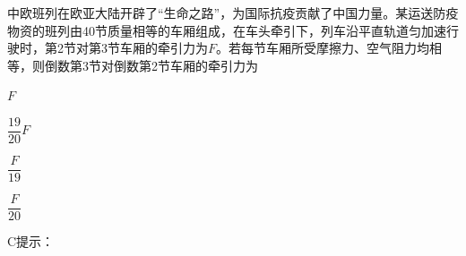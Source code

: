 中欧班列在欧亚大陆开辟了“生命之路”，为国际抗疫贡献了中国力量。某运送防疫物资的班列由40节质量相等的车厢组成，在车头牵引下，列车沿平直轨道匀加速行驶时，第2节对第3节车厢的牵引力为\(F\)。若每节车厢所受摩擦力、空气阻力均相等，则倒数第3节对倒数第2节车厢的牵引力为\paren[]
\begin{choices}
	\item \(F\)
	\item \(\dfrac{19}{20}F\)
	\item \(\dfrac{F}{19}\)
	\item \(\dfrac{F}{20}\)
\end{choices}
\begin{answer}
	C\qquad 提示：
\end{answer}